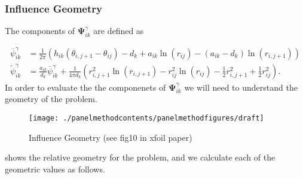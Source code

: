 \subsubsection{Influence Geometry}
\label{sssec:influencegeometry}

The components of \(\mathbf{\Psi}^\gamma_{ik}\) are defined as

\begin{align}
	\overline{\psi}^\gamma_{ik} &= \frac{1}{2\pi} \left( h_{ik} (\theta_{i,j+1} - \theta_{ij}) - d_k + a_{ik} \ln(r_{ij}) - (a_{ik}-d_k)\ln(r_{i,j+1}) \right) \\
	\widetilde{\psi}^\gamma_{ik} &=  \frac{a_{ik}}{d_k}\overline{\psi}^\gamma_{ik} + \frac{1}{4\pi d_k} \left(r^2_{i,j+1} \ln(r_{i,j+1}) - r^2_{ij} \ln(r_{ij}) - \frac{1}{2}r^2_{i,j+1} + \frac{1}{2}r^2_{ij} \right).
\end{align}
\noindent In order to evaluate the the componenets of \(\mathbf{\Psi}^\gamma_{ik}\) we will need to understand the geometry of the problem.

\begin{figure}[h]
	\centering
	\texttt{[image: ./panelmethodcontents/panelmethodfigures/draft]}
	\caption{Influence Geometry (see fig10 in xfoil paper)}
	\label{fig:influencegeometry}
\end{figure}

 shows the relative geometry for the problem, and we calculate each of the geometric values as follows.

